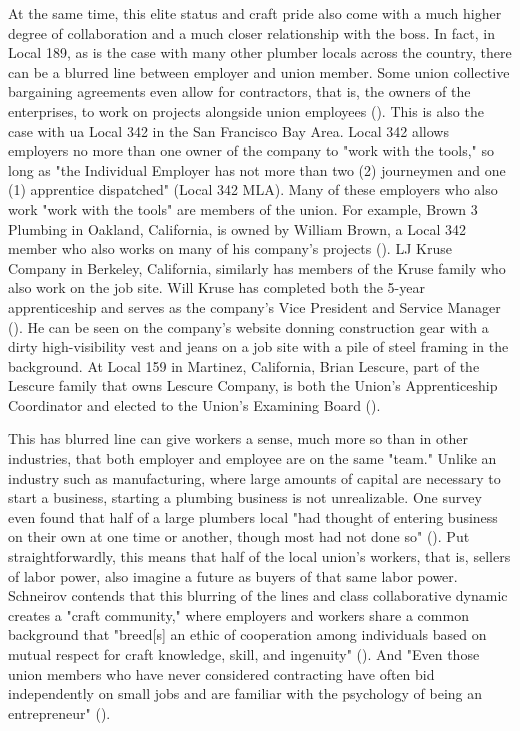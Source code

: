 \documentclass[12pt]{article}
\begin{document}
At the same time, this elite status and craft pride also come with a much higher degree of collaboration and a much closer relationship with the boss. In fact, in Local 189, as is the case with many other plumber locals across the country, there can be a blurred line between employer and union member. Some union collective bargaining agreements even allow for contractors, that is, the owners of the enterprises, to work on projects alongside union employees (\cite[5]{schneirovPrideSolidarityHistory1993}). This is also the case with \acrshort{ua} Local 342 in the San Francisco Bay Area. Local 342 allows employers no more than one owner of the company to "work with the tools," so long as "the Individual Employer has not more than two (2) journeymen and one (1) apprentice dispatched" (Local 342 MLA). Many of these employers who also work "work with the tools" are members of the union. For example, Brown 3 Plumbing in Oakland, California, is owned by William Brown, a Local 342 member who also works on many of his company’s projects (\cite{brownplumbingExecutiveSummary}). LJ Kruse Company in Berkeley, California, similarly has members of the Kruse family who also work on the job site. Will Kruse has completed both the 5-year apprenticeship and serves as the company’s Vice President and Service Manager (\cite{ljkruseUs}). He can be seen on the company’s website donning construction gear with a dirty high-visibility vest and jeans on a job site with a pile of steel framing in the background. At Local 159 in Martinez, California, Brian Lescure, part of the Lescure family that owns Lescure Company, is both the Union’s Apprenticeship Coordinator and elected to the Union’s Examining Board (\cite{lescureLinkedIn}).

This has blurred line can give workers a sense, much more so than in other industries, that both employer and employee are on the same "team." Unlike an industry such as manufacturing, where large amounts of capital are necessary to start a business, starting a plumbing business is not unrealizable. One survey even found that half of a large plumbers local "had thought of entering business on their own at one time or another, though most had not done so" (\cite[5]{schneirovPrideSolidarityHistory1993}). Put straightforwardly, this means that half of the local union’s workers, that is, sellers of labor power, also imagine a future as buyers of that same labor power. Schneirov contends that this blurring of the lines and class collaborative dynamic creates a "craft community," where employers and workers share a common background that "breed[s] an ethic of cooperation among individuals based on mutual respect for craft knowledge, skill, and ingenuity" (\cite[6]{schneirovPrideSolidarityHistory1993}). And "Even those union members who have never considered contracting have often bid independently on small jobs and are familiar with the psychology of being an entrepreneur" (\cite[5--6]{schneirovPrideSolidarityHistory1993}). 
\end{document}
